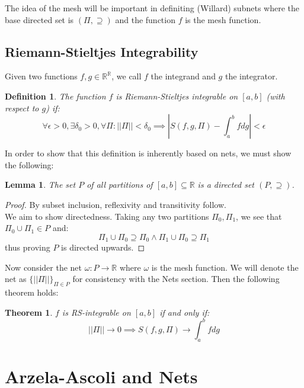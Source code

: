 \documentclass[10pt,letterpaper]{article} %
\newtheorem{thm}{Theorem}[section]
\newtheorem{lem}{Lemma}[section]
\newtheorem{defn}{Definition}[section]
\begin{document}
The idea of the mesh will be important in definiting (Willard) subnets where the base directed set is $(\Pi, \supseteq)$ and the function $f$ is the mesh function. 

\subsection{Riemann-Stieltjes Integrability}
Given two functions $f, g \in \mathbb{R}^\mathbb{R}$, we call $f$ the integrand and $g$ the integrator.
\begin{defn}
The function $f$ is Riemann-Stieltjes integrable on $[a, b]$ (with respect to $g$) if:
\begin{equation*}
\forall \epsilon > 0, \exists \delta_0 > 0, \forall \Pi: ||\Pi|| < \delta_0 \implies \left|S(f, g, \Pi) - \int_{a}^{b}fdg\right| < \epsilon
\end{equation*}
\end{defn}
In order to show that this definition is inherently based on nets, we must show the following:
\begin{lem}
The set $P$ of all partitions of $[a, b] \subseteq \mathbb{R}$ is a directed set $(P, \supseteq)$.
\end{lem}
\begin{proof}
By subset inclusion, reflexivity and transitivity follow.\\

We aim to show directedness. Taking any two partitions $\Pi_0, \Pi_1$, we see that $\Pi_0 \cup \Pi_1 \in P$ and:
\begin{equation*}
\Pi_1 \cup \Pi_0 \supseteq \Pi_0 \land \Pi_1 \cup \Pi_0 \supseteq \Pi_1
\end{equation*}
thus proving $P$ is directed upwards.
\end{proof}
Now consider the net $\omega: P \xrightarrow{} \mathbb{R}$ where $\omega$ is the mesh function. We will denote the net as $\{||\Pi||\}_{\Pi \in P}$ for consistency with the Nets section. Then the following theorem holds:
\begin{thm}
$f$ is RS-integrable on $[a, b]$ if and only if:
\begin{equation*}
||\Pi|| \xrightarrow{} 0 \implies S(f, g, \Pi) \xrightarrow{} \int_{a}^{b}fdg
\end{equation*}
\end{thm}

\pagebreak
\section{Arzela-Ascoli and Nets}
\end{document}
